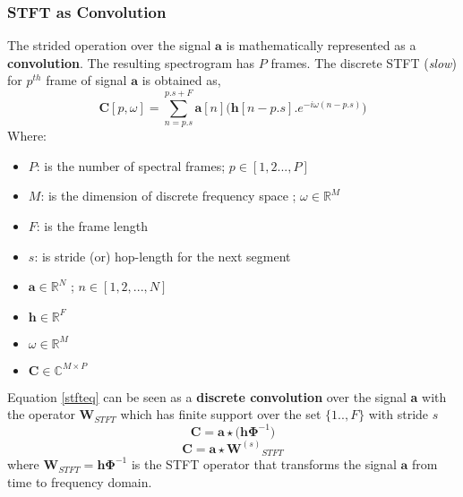 \subsubsection{STFT as Convolution}
\noindent The strided operation over the signal $\textbf{a}$ is mathematically represented as a \textbf{convolution}. The resulting spectrogram has $P$ frames. The discrete STFT (\textit{slow}) for $p^{th}$ frame of signal $\textbf{a}$ is obtained as,
\begin{equation}
\label{stfteq}
\textbf{C}[p, \omega ] = \displaystyle\sum_{n=p.s}^{p.s + F}\textbf{a}[n] \Big( \textbf{h}[n-p.s] . e^{-i \omega (n-p.s)} \Big)
\end{equation}
Where:
\begin{itemize}[label=]
    \setlength\itemsep{0em}
    \item $P$: is the number of spectral frames; $p \in [1,2...,P]$ 
    \item $M$: is the dimension of discrete frequency space ; $\omega \in \mathbb{R}^{M}$
    \item $F$: is the frame length 
    \item $s$: is stride (or) hop-length for the next segment
    \item $\textbf{a} \in  \mathbb{R}^{N}$ ; $n \in [1,2,...,N]$
    \item $\textbf{h} \in  \mathbb{R}^{F}$
    \item $\omega \in  \mathbb{R}^{M}$
    \item $\textbf{C} \in \mathbb{C}^{M \times P}$
\end{itemize}
\noindent Equation \ref{stfteq} can be seen as a \textbf{discrete convolution} over the signal \textbf{a} with the operator $\textbf{W}_{STFT}$ which has finite support over the set $\{1..,F\}$ with stride $s$
\[
\textbf{C} = \textbf{a} \star \big( \textbf{h} \bm{\Phi}^{-1} \big)
\]
\begin{equation}
\label{eq:stft}
\textbf{C} = \textbf{a} \star {\textbf{W}^{(s)}}_{STFT}
\end{equation}
where $\textbf{W}_{STFT} = \textbf{h} \bm{\Phi}^{-1}$ is the STFT operator that transforms the signal $\textbf{a}$ from time to frequency domain. 
\bigskip

